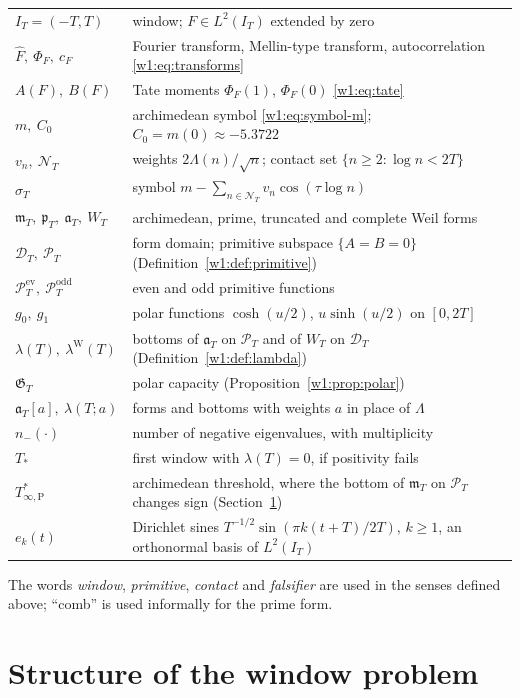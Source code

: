 \documentclass[11pt]{amsart}
\theoremstyle{definition}
\theoremstyle{remark}
\numberwithin{equation}{section}
\newcommand{\IT}{I_T}                                  %
\newcommand{\Fh}{\widehat F}                           %
\newcommand{\cF}{c_F}                                  %
\newcommand{\PhiF}{\Phi_F}                             %
\newcommand{\PT}{\mathcal{P}_T}                        %
\newcommand{\DT}{\mathcal{D}_T}                        %
\newcommand{\NT}{\mathcal{N}_T}                        %
\newcommand{\mT}{\mathfrak{m}_T}                       %
\newcommand{\pT}{\mathfrak{p}_T}                       %
\newcommand{\aT}{\mathfrak{a}_T}                       %
\newcommand{\WT}{W_T}                                  %
\newcommand{\sT}{\sigma_T}                             %
\newcommand{\lam}{\lambda(T)}                          %
\newcommand{\lamW}{\lambda^{\mathrm W}(T)}             %
\newcommand{\Tst}{T_{*}}                               %
\newcommand{\Tarch}{T^{*}_{\infty,\mathrm P}}          %
\begin{document}
\smallskip
\noindent
\begin{tabularx}{\linewidth}{@{}lX@{}}
\toprule
$\IT=(-T,T)$ & window; $F\in L^2(\IT)$ extended by zero\\
$\Fh,\ \PhiF,\ \cF$ & Fourier transform, Mellin-type transform, autocorrelation \eqref{w1:eq:transforms}\\
$A(F),\ B(F)$ & Tate moments $\PhiF(1)$, $\PhiF(0)$ \eqref{w1:eq:tate}\\
$m,\ C_0$ & archimedean symbol \eqref{w1:eq:symbol-m}; $C_0=m(0)\approx-5.3722$\\
$v_n,\ \NT$ & weights $2\Lambda(n)/\sqrt n$; contact set $\{n\ge2:\log n<2T\}$\\
$\sT$ & symbol $m-\sum_{n\in\NT}v_n\cos(\tau\log n)$\\
$\mT,\ \pT,\ \aT,\ \WT$ & archimedean, prime, truncated and complete Weil forms\\
$\DT,\ \PT$ & form domain; primitive subspace $\{A=B=0\}$ (Definition~\ref{w1:def:primitive})\\
$\PT^{\mathrm{ev}},\ \PT^{\mathrm{odd}}$ & even and odd primitive functions\\
$g_0,\ g_1$ & polar functions $\cosh(u/2)$, $u\sinh(u/2)$ on $[0,2T]$\\
$\lam,\ \lamW$ & bottoms of $\aT$ on $\PT$ and of $\WT$ on $\DT$ (Definition~\ref{w1:def:lambda})\\
$\mathfrak G_T$ & polar capacity (Proposition~\ref{w1:prop:polar})\\
$\aT[a],\ \lambda(T;a)$ & forms and bottoms with weights $a$ in place of $\Lambda$\\
$n_-(\cdot)$ & number of negative eigenvalues, with multiplicity\\
$\Tst$ & first window with $\lam=0$, if positivity fails\\
$\Tarch$ & archimedean threshold, where the bottom of $\mT$ on $\PT$ changes sign (Section~\ref{w2:sec:structure})\\
$e_k(t)$ & Dirichlet sines $T^{-1/2}\sin(\pi k(t+T)/2T)$, $k\ge1$, an orthonormal basis of $L^2(\IT)$\\
\bottomrule
\end{tabularx}

\smallskip
The words \emph{window}, \emph{primitive}, \emph{contact} and
\emph{falsifier} are used in the senses defined above; ``comb'' is used
informally for the prime form.


\section{Structure of the window problem}\label{w2:sec:structure}
\end{document}
